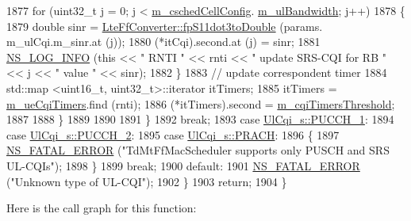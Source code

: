 \begin{DoxyCode}
1877             \textcolor{keywordflow}{for} (uint32\_t j = 0; j < \hyperlink{classns3_1_1TdMtFfMacScheduler_a585412f686e33f49dad1003e5d2216f0}{m\_cschedCellConfig}.
      \hyperlink{structns3_1_1FfMacCschedSapProvider_1_1CschedCellConfigReqParameters_a5ab5b102878e6e7e7727a14af4a64d2f}{m\_ulBandwidth}; j++)
1878               \{
1879                 \textcolor{keywordtype}{double} sinr = \hyperlink{classns3_1_1LteFfConverter_aa5d8c2a8f988dbd63da91818c18666eb}{LteFfConverter::fpS11dot3toDouble} (params.
      m\_ulCqi.m\_sinr.at (j));
1880                 (*itCqi).second.at (j) = sinr;
1881                 \hyperlink{group__logging_gafbd73ee2cf9f26b319f49086d8e860fb}{NS\_LOG\_INFO} (\textcolor{keyword}{this} << \textcolor{stringliteral}{" RNTI "} << rnti << \textcolor{stringliteral}{" update SRS-CQI for RB  "} << j << \textcolor{stringliteral}{"
       value "} << sinr);
1882               \}
1883             \textcolor{comment}{// update correspondent timer}
1884             std::map <uint16\_t, uint32\_t>::iterator itTimers;
1885             itTimers = \hyperlink{classns3_1_1TdMtFfMacScheduler_a6a60cf28e7170cd2fac6402b804827cb}{m\_ueCqiTimers}.find (rnti);
1886             (*itTimers).second = \hyperlink{classns3_1_1TdMtFfMacScheduler_a63ad2273332391bf152913fe2dbfa186}{m\_cqiTimersThreshold};
1887 
1888           \}
1889 
1890 
1891       \}
1892       \textcolor{keywordflow}{break};
1893     \textcolor{keywordflow}{case} \hyperlink{structns3_1_1UlCqi__s_aece9e5ebea42eb9ff1744c72c8459b57a05ca6554bc6fcd96a0a51fbaa8e794c7}{UlCqi\_s::PUCCH\_1}:
1894     \textcolor{keywordflow}{case} \hyperlink{structns3_1_1UlCqi__s_aece9e5ebea42eb9ff1744c72c8459b57a35664b4bda6f1cd6acfe9edc84c7571d}{UlCqi\_s::PUCCH\_2}:
1895     \textcolor{keywordflow}{case} \hyperlink{structns3_1_1UlCqi__s_aece9e5ebea42eb9ff1744c72c8459b57af93f36792cb1eed08f6119e4abfe58e8}{UlCqi\_s::PRACH}:
1896       \{
1897         \hyperlink{group__fatal_ga5131d5e3f75d7d4cbfd706ac456fdc85}{NS\_FATAL\_ERROR} (\textcolor{stringliteral}{"TdMtFfMacScheduler supports only PUSCH and SRS UL-CQIs"});
1898       \}
1899       \textcolor{keywordflow}{break};
1900     \textcolor{keywordflow}{default}:
1901       \hyperlink{group__fatal_ga5131d5e3f75d7d4cbfd706ac456fdc85}{NS\_FATAL\_ERROR} (\textcolor{stringliteral}{"Unknown type of UL-CQI"});
1902     \}
1903   \textcolor{keywordflow}{return};
1904 \}
\end{DoxyCode}


Here is the call graph for this function\+:




